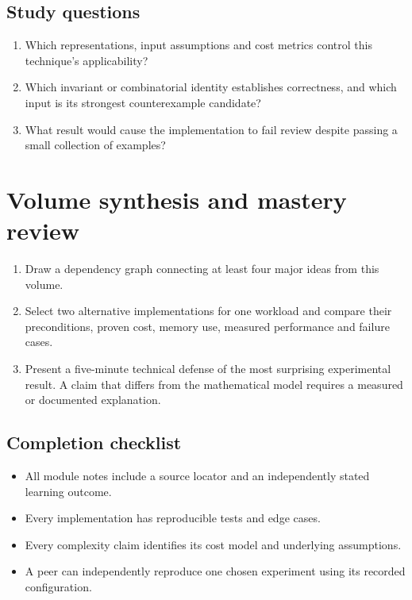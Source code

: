 \documentclass[11pt,letterpaper]{article}
\begin{document}
\subsection{Study questions}
\begin{enumerate}
\item Which representations, input assumptions and cost metrics control this technique's applicability?
\item Which invariant or combinatorial identity establishes correctness, and which input is its strongest counterexample candidate?
\item What result would cause the implementation to fail review despite passing a small collection of examples?
\end{enumerate}

\section{Volume synthesis and mastery review}
\begin{enumerate}
\item Draw a dependency graph connecting at least four major ideas from this volume.
\item Select two alternative implementations for one workload and compare their preconditions, proven cost, memory use, measured performance and failure cases.
\item Present a five-minute technical defense of the most surprising experimental result. A claim that differs from the mathematical model requires a measured or documented explanation.
\end{enumerate}
\subsection{Completion checklist}
\begin{itemize}\item All module notes include a source locator and an independently stated learning outcome.
\item Every implementation has reproducible tests and edge cases.
\item Every complexity claim identifies its cost model and underlying assumptions.
\item A peer can independently reproduce one chosen experiment using its recorded configuration.
\end{itemize}
\end{document}
